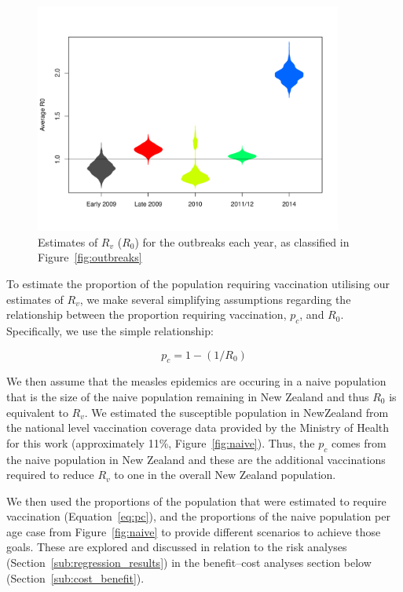 \documentclass{article}
\begin{document}
\begin{figure}
     \centering
     \includegraphics[width=0.9\textwidth]{averageR0.pdf}
     \caption{Estimates of $R_v$ ($R_0$) for the outbreaks each year, as classified in Figure~\ref{fig:outbreaks}}
     \label{fig:r0}
\end{figure}

To estimate the proportion of the population requiring vaccination utilising our estimates of $R_v$, we make several simplifying assumptions regarding the relationship between the proportion requiring vaccination, $p_c$, and $R_0$. Specifically, we use the simple relationship:

\begin{equation} \label{eq:pc}
p_c = 1-(1/R_0)
  \end{equation}

We then assume that the measles epidemics are occuring in a naive population that is the size of the naive population remaining in New Zealand and thus $R_0$ is equivalent to $R_v$. We estimated the susceptible population in NewZealand from the national level vaccination coverage data provided by the Ministry of Health for this work (approximately 11\%, Figure~\ref{fig:naive}). Thus, the $p_c$ comes from the naive population in New Zealand and these are the additional vaccinations required to reduce $R_v$ to one in the overall New Zealand population.

We then used the proportions of the population that were estimated to require vaccination (Equation~\ref{eq:pc}), and the proportions of the naive population per age case from Figure~\ref{fig:naive} to provide different scenarios to achieve those goals. These are explored and discussed in relation to the risk analyses (Section~\ref{sub:regression_results}) in the benefit--cost analyses section below (Section~\ref{sub:cost_benefit}).
\end{document}

